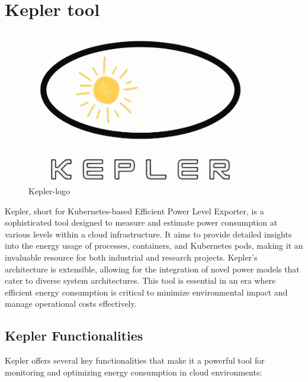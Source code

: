 \section{Kepler tool}
\begin{figure}[H]
  \centering
  \includegraphics[width=10cm]{Logos/kepler-logo.png}
  \caption{Kepler-logo}
\end{figure}
Kepler, short for Kubernetes-based Efficient Power Level Exporter, is a sophisticated tool designed to measure and estimate power consumption at various levels within a cloud infrastructure. It aims to provide detailed insights into the energy usage of processes, containers, and Kubernetes pods, making it an invaluable resource for both industrial and research projects. Kepler’s architecture is extensible, allowing for the integration of novel power models that cater to diverse system architectures. This tool is essential in an era where efficient energy consumption is critical to minimize environmental impact and manage operational costs effectively.

\subsection{Kepler Functionalities}

Kepler offers several key functionalities that make it a powerful tool for monitoring and optimizing energy consumption in cloud environments:

